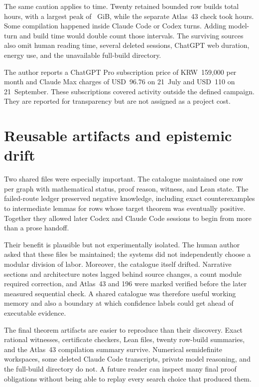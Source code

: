 \documentclass[11pt]{article}
\begin{document}
The same caution applies to time.  Twenty retained bounded row builds total
\BoundedHours{} hours, with a largest peak of \BoundedPeakGiB{}~GiB, while the
separate Atlas~43 check took \AtlasFortyThreeHours{} hours.  Some compilation
happened inside Claude Code or Codex turns.  Adding model-turn and build time
would double count those intervals.  The surviving sources also omit human
reading time, several deleted sessions, ChatGPT web duration, energy use, and
the unavailable full-build directory.

The author reports a ChatGPT Pro subscription price of KRW~159,000 per month
and Claude Max charges of USD~96.76 on 21~July and USD~110 on 21~September.
These subscriptions covered activity outside the defined campaign.  They are
reported for transparency but are not assigned as a project cost.

\section{Reusable artifacts and epistemic drift}
\label{sec:artifacts}

Two shared files were especially important.  The catalogue maintained one
row per graph with mathematical status, proof reason, witness, and Lean state.
The failed-route ledger preserved negative knowledge, including exact
counterexamples to intermediate lemmas for rows whose target theorem was
eventually positive.  Together they allowed later Codex and Claude Code
sessions to begin from more than a prose handoff.

Their benefit is plausible but not experimentally isolated.  The human author
asked that these files be maintained; the systems did not independently
choose a modular division of labor.  Moreover, the catalogue itself drifted.
Narrative sections and architecture notes lagged behind source changes, a
count module required correction, and Atlas~43 and 196 were marked verified
before the later measured sequential check.  A shared catalogue was therefore
useful working memory and also a boundary at which confidence labels could
get ahead of executable evidence.

The final theorem artifacts are easier to reproduce than their discovery.
Exact rational witnesses, certificate checkers, Lean files, twenty row-build
summaries, and the Atlas~43 compilation summary survive.  Numerical
semidefinite workspaces, some deleted Claude Code transcripts, private model
reasoning, and the full-build directory do not.  A future reader can inspect
many final proof obligations without being able to replay every search choice
that produced them.
\end{document}
